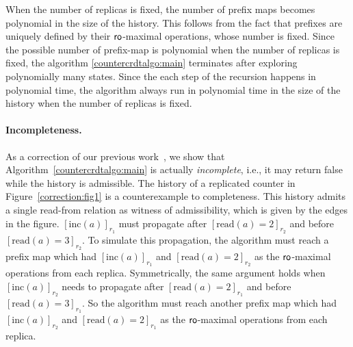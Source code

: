 When the number of replicas is fixed, the number of prefix maps becomes polynomial in the size of the history. This follows from the fact that prefixes are uniquely defined by their $\mathsf{ro}$-maximal operations, whose number is fixed. Since the possible number of prefix-map is polynomial when the number of replicas is fixed, the algorithm \ref{countercrdtalgo:main} terminates after exploring polynomially many states. Since the each step of the recursion happens in polynomial time, the algorithm always run in polynomial time in the size of the history when the number of replicas is fixed. 




\paragraph{Incompleteness.}
As a correction of our previous work~\cite{DBLP:conf/cav/BiswasEE19}, we show that Algorithm~\ref{countercrdtalgo:main} is actually \emph{incomplete}, i.e., it may return false while the history is admissible. The history of a replicated counter in Figure~\ref{correction:fig1} is a counterexample to completeness. This history admits a single read-from relation as witness of admissibility, which is given by the edges in the figure. $[\mathrm{inc}(a)]_{r_1}$ must propagate after $[\mathrm{read}(a) = 2]_{r_2}$ and before $[\mathrm{read}(a) = 3]_{r_2}$. To simulate this propagation, the algorithm must reach a prefix map which had $[\mathrm{inc}(a)]_{r_1}$ and $[\mathrm{read}(a) = 2]_{r_2}$ as the $\mathsf{ro}$-maximal operations from each replica. Symmetrically, the same argument holds when $[\mathrm{inc}(a)]_{r_2}$ needs to propagate after $[\mathrm{read}(a) = 2]_{r_1}$ and before $[\mathrm{read}(a) = 3]_{r_1}$. So the algorithm must reach another prefix map which had $[\mathrm{inc}(a)]_{r_2}$ and $[\mathrm{read}(a) = 2]_{r_1}$ as the $\mathsf{ro}$-maximal operations from each replica. 


